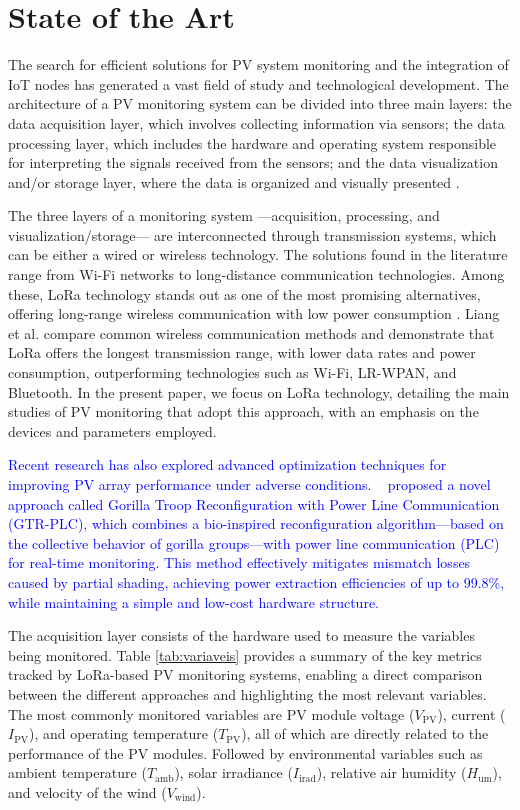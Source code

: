 \section{ State of the Art}
\label{sec:stat}
The search for efficient solutions for PV system monitoring and the integration of IoT nodes has generated a vast field of study and technological development. The architecture of a PV monitoring system can be divided into three main layers: the data acquisition layer, which involves collecting information via sensors; the data processing layer, which includes the hardware and operating system responsible for interpreting the signals received from the sensors; and the data visualization and/or storage layer, where the data is organized and visually presented \cite{ansari2021review}. 

The three layers of a monitoring system —acquisition, processing, and visualization/storage— are interconnected through transmission systems, which can be either a wired or wireless technology. The solutions found in the literature range from Wi-Fi networks \cite{dupont2018internet,pereira2019iot} to long-distance communication technologies. Among these, LoRa technology stands out as one of the most promising alternatives, offering long-range wireless communication with low power consumption \cite{hamed2024solar}. Liang et al. \cite{liang2020performance} compare common wireless communication methods and demonstrate that LoRa offers the longest transmission range, with lower data rates and power consumption, outperforming technologies such as Wi-Fi, LR-WPAN, and Bluetooth. In the present paper, we focus on LoRa technology, detailing the main studies of PV monitoring that adopt this approach, with an emphasis on the devices and parameters employed.

\textcolor{blue}{
Recent research has also explored advanced optimization techniques for improving PV array performance under adverse conditions. ~\cite{aljafari2024} proposed a novel approach called Gorilla Troop Reconfiguration with Power Line Communication (GTR-PLC), which combines a bio-inspired reconfiguration algorithm—based on the collective behavior of gorilla groups—with power line communication (PLC) for real-time monitoring. This method effectively mitigates mismatch losses caused by partial shading, achieving power extraction efficiencies of up to 99.8\%, while maintaining a simple and low-cost hardware structure.
}


The acquisition layer consists of the hardware used to measure the variables being monitored. Table \ref{tab:variaveis} provides a summary of the key metrics tracked by LoRa-based PV monitoring systems, enabling a direct comparison  between the different approaches and highlighting the most relevant variables. The most commonly monitored variables are PV module voltage ($V_\text{PV}$), current ($I_\text{PV}$), and operating temperature ($T_\text{PV}$), all of which are directly related to the performance of the PV modules. Followed by environmental variables such as ambient temperature ($T_\text{amb}$), solar irradiance ($I_\text{irad}$), relative air humidity ($H_\text{um}$), and velocity of the wind ($V_\text{wind}$).

